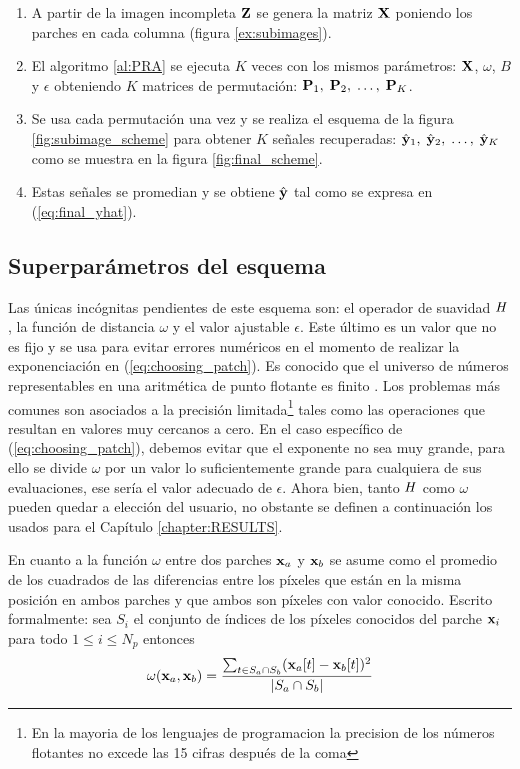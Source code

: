 \begin{enumerate}
	\item A partir de la imagen incompleta $\Z$ se genera la matriz $\X$ poniendo los parches en cada columna (figura \ref{ex:subimages}).
	\item El algoritmo \ref{al:PRA} se ejecuta $K$ veces con los mismos par\'ametros: $\X$, $\omega$, $B$ y $\epsilon$ obteniendo $K$ matrices de permutaci\'on: $\P_1,\; \P_2,\; \dots,\; \P_K$.
	\item Se usa cada permutaci\'on una vez y se realiza el esquema de la figura \ref{fig:subimage_scheme} para obtener $K$ señales recuperadas: $\yhat_1,\; \yhat_2,\; \dots,\; \yhat_K$ como se muestra en la figura \ref{fig:final_scheme}.
	\item Estas señales se promedian y se obtiene $\yhat$ tal como se expresa en (\ref{eq:final_yhat}).
\end{enumerate}

\subsection{Superpar\'ametros del esquema}
Las \'unicas incógnitas pendientes de este esquema son: el operador de suavidad $\H$, la funci\'on de distancia $\omega$ y el valor ajustable $\epsilon$. Este \'ultimo es un valor que no es fijo y se usa para evitar errores num\'ericos en el momento de realizar la exponenciaci\'on en (\ref{eq:choosing_patch}). Es conocido que el universo de números representables en una aritmética de punto flotante es finito \cite{conte2017elementary}. Los problemas m\'as comunes son asociados a la precisión limitada\footnote{En la mayoria de los lenguajes de programacion la precision de los n\'umeros flotantes no excede las 15 cifras despu\'es de la coma} tales como las operaciones que resultan en valores muy cercanos a cero. En el caso espec\'ifico de (\ref{eq:choosing_patch}), debemos evitar que el exponente no sea muy grande, para ello se divide $\omega$ por un valor lo suficientemente grande para cualquiera de sus evaluaciones, ese ser\'ia el valor adecuado de $\epsilon$. Ahora bien, tanto $\H$ como $\omega$ pueden quedar a elecci\'on del usuario, no obstante se definen a continuaci\'on los usados para el Cap\'itulo \ref{chapter:RESULTS}.

En cuanto a la funci\'on $\omega$ entre dos parches $\x_a$ y $\x_b$ se asume como el promedio de los cuadrados de las diferencias entre los p\'ixeles que est\'an en la misma posici\'on en ambos parches y que ambos son p\'ixeles con valor conocido. Escrito formalmente: sea $S_i$ el conjunto de \'indices de los p\'ixeles conocidos del parche $\x_i$ para todo $1 \le i \le N_p$ entonces
\begin{equation}
\omega(\x_a, \x_b) = \frac{\sum_{t \in S_a \cap S_b} (\x_a[t] - \x_b[t])^2}{|S_a \cap S_b|}
\end{equation}

